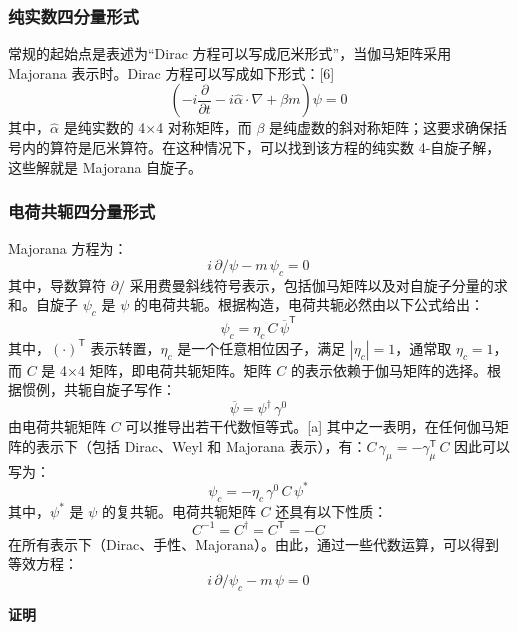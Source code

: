 \subsubsection{纯实数四分量形式}
常规的起始点是表述为“Dirac 方程可以写成厄米形式”，当伽马矩阵采用 Majorana 表示时。Dirac 方程可以写成如下形式：[6]
\[
\left( -i \frac{\partial}{\partial t} - i \hat{\alpha} \cdot \nabla + \beta m \right) \psi = 0~
\]
其中，\(\hat{\alpha}\) 是纯实数的 4×4 对称矩阵，而 \(\beta\) 是纯虚数的斜对称矩阵；这要求确保括号内的算符是厄米算符。在这种情况下，可以找到该方程的纯实数 4-自旋子解，这些解就是 Majorana 自旋子。
\subsubsection{电荷共轭四分量形式} 
Majorana 方程为：
\[
i \, \partial \!\!\!{\big /} \psi - m \, \psi_c = 0~
\]
其中，导数算符 \(\partial \!\!\!{\big /}\) 采用费曼斜线符号表示，包括伽马矩阵以及对自旋子分量的求和。自旋子 \(\psi_c\) 是 \(\psi\) 的电荷共轭。根据构造，电荷共轭必然由以下公式给出：
\[
\psi_c = \eta_c \, C \, {\overline{\psi}}^{\mathsf{T}}~
\]
其中，\((\cdot)^{\mathsf{T}}\) 表示转置，\(\eta_c\) 是一个任意相位因子，满足 \(|\eta_c| = 1\)，通常取 \(\eta_c = 1\)，而 \(C\) 是 4×4 矩阵，即电荷共轭矩阵。矩阵 \(C\) 的表示依赖于伽马矩阵的选择。根据惯例，共轭自旋子写作：
\[
{\overline{\psi}} = \psi^\dagger \, \gamma^0~
\]
由电荷共轭矩阵 \(C\) 可以推导出若干代数恒等式。[a] 其中之一表明，在任何伽马矩阵的表示下（包括 Dirac、Weyl 和 Majorana 表示），有：\(C \, \gamma_\mu = - \gamma_\mu^{\mathsf{T}} \, C\)
因此可以写为：
\[
\psi_c = - \eta_c \, \gamma^0 \, C \, \psi^*~
\]
其中，\(\psi^*\) 是 \(\psi\) 的复共轭。电荷共轭矩阵 \(C\) 还具有以下性质：
\[
C^{-1} = C^\dagger = C^{\mathsf{T}} = -C~
\]
在所有表示下（Dirac、手性、Majorana）。由此，通过一些代数运算，可以得到等效方程：
\[
i \, \partial \!\!\!{\big /} \psi_c - m \, \psi = 0~
\]

\textbf{证明} 

